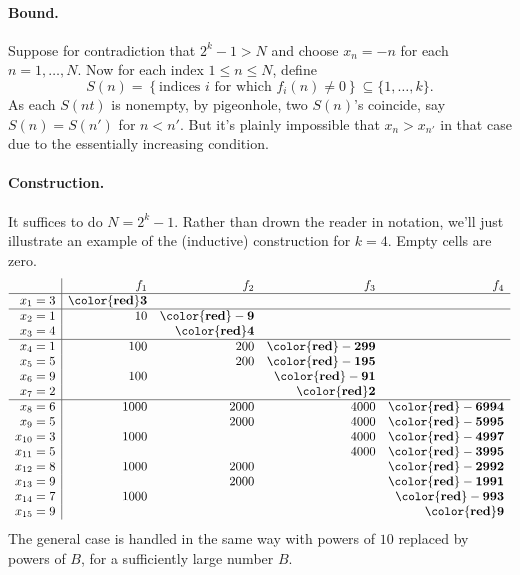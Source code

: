 \documentclass[11pt]{scrartcl}
\begin{document}
\paragraph{Bound.}
Suppose for contradiction that $2^k-1 > N$
and choose $x_n = -n$ for each $n = 1, \dots, N$.
Now for each index $1 \le n \le N$, define
\[ S(n) = \left\{
    \text{indices $i$ for which $f_i(n) \neq 0$}
  \right\} \subseteq \{1,\dots,k\}.
\]
As each $S(nt)$ is nonempty, by pigeonhole, two $S(n)$'s coincide,
say $S(n) = S(n')$ for $n < n'$.
But it's plainly impossible that $x_n > x_{n'}$ in that case
due to the essentially increasing condition.

\paragraph{Construction.}
It suffices to do $N = 2^k-1$.
Rather than drown the reader in notation, we'll just illustrate
an example of the (inductive) construction for $k=4$.
Empty cells are zero.
\[
  \begin{array}{r|rrrr}
    & f_1 & f_2 & f_3 & f_4 \\ \hline
    x_1 = 3 & \mathbf{\color{red}3} &&& \\ \hline
    x_2 = 1 & 10 & \mathbf{\color{red}-9} && \\
    x_3 = 4 & & \mathbf{\color{red}4} && \\ \hline
    x_4 = 1 & 100 & 200 & \mathbf{\color{red}-299} & \\
    x_5 = 5 & & 200 & \mathbf{\color{red}-195} & \\
    x_6 = 9 & 100 & & \mathbf{\color{red}-91} & \\
    x_7 = 2 & & & \mathbf{\color{red}2} & \\ \hline
    x_8 = 6 & 1000 & 2000 & 4000 & \mathbf{\color{red}-6994} \\
    x_{9} = 5 & & 2000 & 4000 & \mathbf{\color{red}-5995} \\
    x_{10} = 3 & 1000 & & 4000 & \mathbf{\color{red}-4997} \\
    x_{11} = 5 & & & 4000 & \mathbf{\color{red}-3995} \\
    x_{12} = 8 & 1000 & 2000 & & \mathbf{\color{red}-2992} \\
    x_{13} = 9 & & 2000 & & \mathbf{\color{red}-1991} \\
    x_{14} = 7 & 1000 & & & \mathbf{\color{red}-993} \\
    x_{15} = 9 & & & & \mathbf{\color{red}9}
  \end{array}
\]
The general case is handled in the same way with powers of $10$
replaced by powers of $B$, for a sufficiently large number $B$.
\pagebreak
\end{document}
